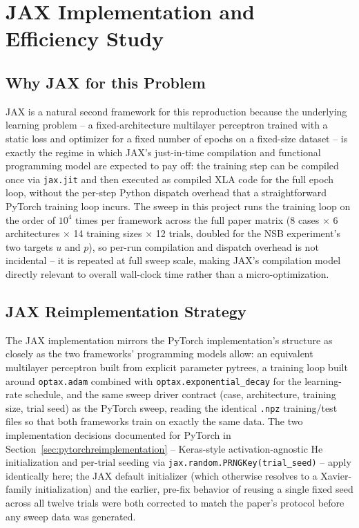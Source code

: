\cleardoubleoddpage%
\chapter{JAX Implementation and Efficiency Study}
\label{sec:jaximplementation}

\section{Why JAX for this Problem}

JAX \cite{bradbury2018jax} is a natural second framework for this
reproduction because the underlying learning problem -- a fixed-architecture
multilayer perceptron trained with a static loss and optimizer for a fixed
number of epochs on a fixed-size dataset -- is exactly the regime in which
JAX's just-in-time compilation and functional programming model are
expected to pay off: the training step can be compiled once via
\texttt{jax.jit} and then executed as compiled XLA code for the full epoch
loop, without the per-step Python dispatch overhead that a straightforward
PyTorch training loop incurs. The sweep in this project runs the training
loop on the order of $10^4$ times per framework across the full paper
matrix (8 cases $\times$ 6 architectures $\times$ 14 training sizes
$\times$ 12 trials, doubled for the NSB experiment's two targets $u$ and
$p$), so per-run compilation and dispatch overhead is not incidental -- it
is repeated at full sweep scale, making JAX's compilation model directly
relevant to overall wall-clock time rather than a micro-optimization.

\section{JAX Reimplementation Strategy}

The JAX implementation mirrors the PyTorch implementation's structure as
closely as the two frameworks' programming models allow: an equivalent
multilayer perceptron built from explicit parameter pytrees, a training
loop built around \texttt{optax.adam} combined with
\texttt{optax.exponential\_decay} for the learning-rate schedule, and the
same sweep driver contract (case, architecture, training size, trial seed)
as the PyTorch sweep, reading the identical \texttt{.npz} training/test
files so that both frameworks train on exactly the same data. The two
implementation decisions documented for PyTorch in
Section~\ref{sec:pytorchreimplementation} -- Keras-style
activation-agnostic He initialization and per-trial seeding via
\texttt{jax.random.PRNGKey(trial\_seed)} -- apply identically here; the
JAX default initializer (which otherwise resolves to a Xavier-family
initialization) and the earlier, pre-fix behavior of reusing a single
fixed seed across all twelve trials were both corrected to match the
paper's protocol before any sweep data was generated.

